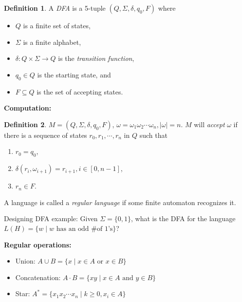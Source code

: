 \documentclass[a4paper,12pt]{article}
\theoremstyle{remark}
\theoremstyle{definition}
\newtheorem{definition}{Definition}
\begin{document}
\begin{definition}
    A \emph{DFA} is a 5-tuple $(Q, \Sigma, \delta, q_0, F)$ where
    \begin{itemize}
        \item
            $Q$ is a finite set of states,
        \item
            $\Sigma$ is a finite alphabet,
        \item
            $\delta : Q \times \Sigma \to Q$ is the \emph{transition function},
        \item
            $q_0 \in Q$ is the starting state, and
        \item
            $F \subseteq Q$ is the set of accepting states.
    \end{itemize}
\end{definition}
\textbf{Computation:}
\begin{definition}
    $M = (Q, \Sigma, \delta, q_0, F)$, $\omega = \omega_1 \omega_2 \cdots \omega_n, |\omega| = n$. $M$ will \emph{accept} $\omega$ if there is a sequence of states $r_0, r_1, \cdots, r_n$ in $Q$ such that
\begin{enumerate}
    \item
        $r_0 = q_0$,
    \item
        $\delta(r_i, \omega_{i + 1}) = r_{i + 1}, i \in [0, n - 1]$,
    \item
        $r_n \in F$.
\end{enumerate}
A language is called a \emph{regular language} if some finite automaton recognizes it. \par
\end{definition}
Designing DFA example: Given $\Sigma = \{ 0, 1 \}$, what is the DFA for the language $L(H) = \{ w \mid w \text{ has an odd \# of 1's}\}$?
\begin{center}
\end{center}
\textbf{Regular operations:}
\begin{itemize}
    \item
        Union: $A \cup B = \{ x \mid x \in A \text{ or } x \in B \}$
    \item
        Concatenation: $A \cdot B = \{ xy \mid x \in A \text{ and } y \in B \}$
    \item
        Star: $A^* = \{ x_1 x_2 \cdots x_n \mid k \geq 0, x_i \in A \}$
\end{itemize}
\end{document}
